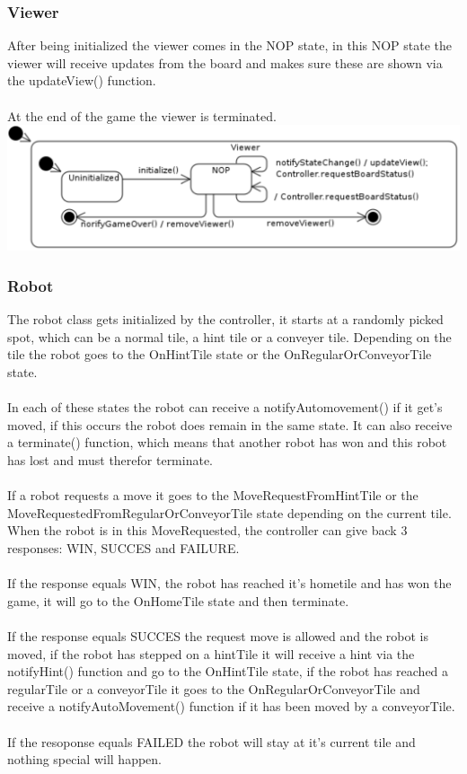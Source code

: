 	\subsubsection{Viewer}
	After being initialized the viewer comes in the NOP state, in this NOP state the viewer will receive updates from the board and makes sure these are shown via the updateView() function.\\
\\
At the end of the game the viewer is terminated.\\
	
	\includegraphics[width=\linewidth]{statecharts/view.pdf}

	\subsubsection{Robot}
	The robot class gets initialized by the controller, it starts at a randomly picked spot, which can be a normal tile, a hint tile or a conveyer tile. Depending on the tile the robot goes to the OnHintTile state or the OnRegularOrConveyorTile state.\\
\\
In each of these states the robot can receive a notifyAutomovement() if it get's moved, if this occurs the robot does remain in the same state. It can also receive a terminate() function, which means that another robot has won and this robot has lost and must therefor terminate.\\
\\
If a robot requests a move it goes to the MoveRequestFromHintTile or the MoveRequestedFromRegularOrConveyorTile state depending on the current tile. When the robot is in this MoveRequested, the controller can give back 3 responses: WIN, SUCCES and FAILURE.\\
\\
If the response equals WIN, the robot has reached it's hometile and has won the game, it will go to the OnHomeTile state and then terminate. \\
\\
If the response equals SUCCES the request move is allowed and the robot is moved, if the robot has stepped on a hintTile it will receive a hint via the notifyHint() function and go to the OnHintTile state, if the robot has reached a regularTile or a conveyorTile it goes to the OnRegularOrConveyorTile and receive a notifyAutoMovement() function if it has been moved by a conveyorTile.\\
\\
If the resoponse equals FAILED the robot will stay at it's current tile and nothing special will happen.\\
	
